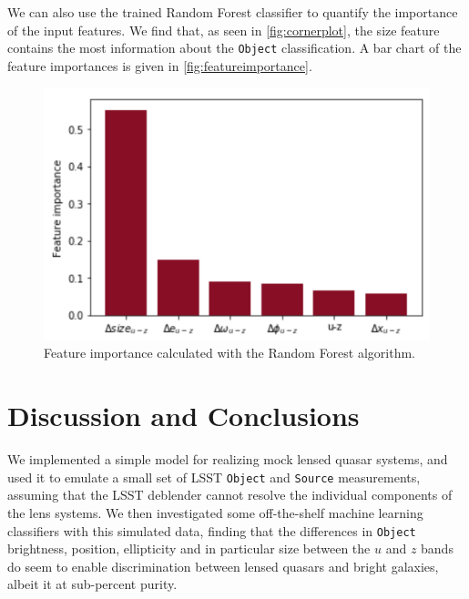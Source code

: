 \documentclass[\docopts]{\docclass}
\def\Object{\texttt{Object}\xspace}
\def\Source{\texttt{Source}\xspace}
\begin{document}
We can also use the trained Random Forest classifier to quantify the
importance of the input features. We find that, as seen in
\autoref{fig:cornerplot}, the size feature contains the most information
about the \Object classification.  A bar chart of the feature
importances is given in \autoref{fig:featureimportance}.

\begin{figure}[!h]
\includegraphics[width=0.4\columnwidth]{FeatureImportance.png}
\caption{Feature importance calculated with the Random Forest algorithm.}
 \label{fig:featureimportance}
\end{figure}



\section{Discussion and Conclusions}
\label{sec:conclusions}

We implemented a simple model for realizing mock lensed quasar systems,
and used it to emulate a small set of LSST \Object and \Source
measurements, assuming that the LSST deblender cannot resolve the
individual components of the lens systems. We then investigated some
off-the-shelf machine learning classifiers with this simulated data,
finding that the differences in \Object brightness, position,
ellipticity and in particular size between the $u$ and $z$ bands do seem
to enable discrimination between lensed quasars and bright galaxies,
albeit it at sub-percent purity.
\end{document}
